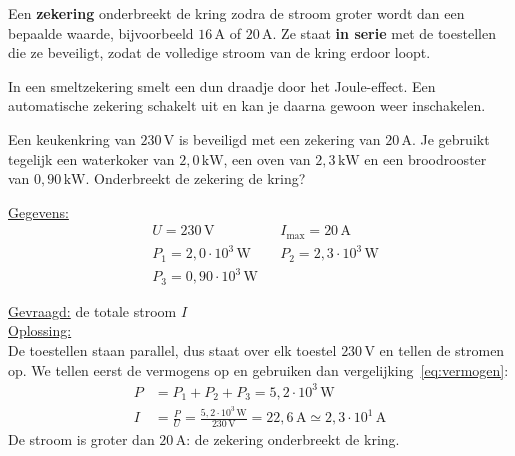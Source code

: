 \documentclass{ximera}
\begin{document}
\begin{definition}[foldable=true,title={Zekering}]\nl
    Een \textbf{zekering} onderbreekt de kring zodra de stroom groter wordt dan een bepaalde waarde, bijvoorbeeld $16\,\mathrm{A}$ of $20\,\mathrm{A}$. Ze staat \textbf{in serie} met de toestellen die ze beveiligt, zodat de volledige stroom van de kring erdoor loopt.
\end{definition}

In een smeltzekering smelt een dun draadje door het Joule-effect. Een automatische zekering schakelt uit en kan je daarna gewoon weer inschakelen.

\begin{example}[foldable=true,title={Voorbeeld: springt de zekering?}]\nl
    Een keukenkring van $230\,\mathrm{V}$ is beveiligd met een zekering van $20\,\mathrm{A}$. Je gebruikt tegelijk een waterkoker van $2{,}0\,\mathrm{kW}$, een oven van $2{,}3\,\mathrm{kW}$ en een broodrooster van $0{,}90\,\mathrm{kW}$. Onderbreekt de zekering de kring?

    \begin{solution}\nl
        \underline{Gegevens:}
        \begin{align*}
            & U = 230\,\mathrm{V} & & I_{\text{max}} = 20\,\mathrm{A} \\
            & P_1 = 2{,}0 \cdot 10^{3}\,\mathrm{W} & & P_2 = 2{,}3 \cdot 10^{3}\,\mathrm{W} \\
            & P_3 = 0{,}90 \cdot 10^{3}\,\mathrm{W} & &
        \end{align*}

        \underline{Gevraagd:} de totale stroom $I$ \\

        \underline{Oplossing:}\\
        De toestellen staan parallel, dus staat over elk toestel $230\,\mathrm{V}$ en tellen de stromen op. We tellen eerst de vermogens op en gebruiken dan vergelijking~\ref{eq:vermogen}:
        \begin{align*}
            P &= P_1 + P_2 + P_3 = 5{,}2 \cdot 10^{3}\,\mathrm{W} \\
            I &= \frac{P}{U} = \frac{5{,}2 \cdot 10^{3}\,\mathrm{W}}{230\,\mathrm{V}} = 22{,}6\,\mathrm{A} \simeq \boxed{2{,}3 \cdot 10^{1}\,\mathrm{A}}
        \end{align*}
        De stroom is groter dan $20\,\mathrm{A}$: de zekering onderbreekt de kring.
    \end{solution}
\end{example}
\end{document}
